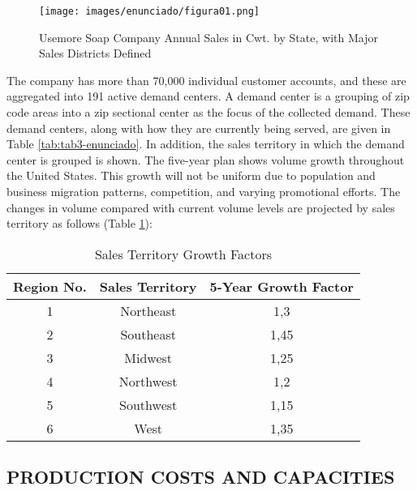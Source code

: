\documentclass[12pt,a4paper]{article}
\begin{document}
\begin{figure}
    \centering
    \texttt{[image: images/enunciado/figura01.png]}
    \caption{Usemore Soap Company Annual Sales in Cwt. by State, with Major Sales Districts Defined}\label{fig:salesTerritories}
\end{figure}


The company has more than 70,000 individual customer accounts, and these are aggregated into 191 active demand centers.
A demand center is a grouping of zip code areas into a zip sectional center as the focus of the collected demand.
These demand centers, along with how they are currently being served, are given in Table \ref{tab:tab3-enunciado}.
In addition, the sales territory in which the demand center is grouped is shown.
The five-year plan shows volume growth throughout the United States.
This growth will not be uniform due to population and business migration patterns, competition, and varying promotional efforts.
The changes in volume compared with current volume levels are projected by sales territory as follows (Table \ref{tab:tabelaa-enunciado}):

\begin{table}[!h]
    \centering
    \caption{Sales Territory Growth Factors} \label{tab:tabelaa-enunciado}
    \begin{tabular}{|c|c|c|}
    \hline
    \textbf{Region No.} & \textbf{Sales Territory} & \textbf{5-Year Growth Factor} \\
    \hline
    1                   & Northeast                & 1,3                           \\
    2                   & Southeast                & 1,45                          \\
    3                   & Midwest                  & 1,25                          \\
    4                   & Northwest                & 1,2                           \\
    5                   & Southwest                & 1,15                          \\
    6                   & West                     & 1,35     \\
    \hline
\end{tabular}
\end{table}

\subsection{PRODUCTION COSTS AND CAPACITIES}
\end{document}
